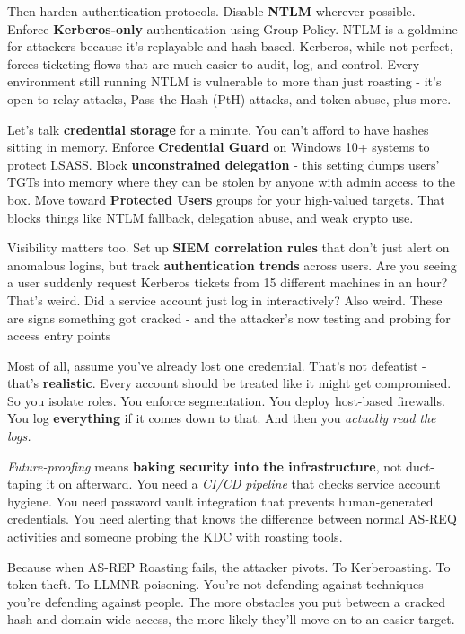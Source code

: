 Then harden authentication protocols. Disable \textbf{NTLM} wherever possible. Enforce \textbf{Kerberos-only} authentication using Group Policy. NTLM is a goldmine for attackers because it’s replayable and hash-based. Kerberos, while not perfect, forces ticketing flows that are much easier to audit, log, and control. Every environment still running NTLM is vulnerable to more than just roasting - it’s open to relay attacks, Pass-the-Hash (PtH) attacks, and token abuse, plus more.

Let’s talk \textbf{credential storage} for a minute. You can’t afford to have hashes sitting in memory. Enforce \textbf{Credential Guard }on Windows 10+ systems to protect LSASS. Block \textbf{unconstrained delegation} - this setting dumps users’ TGTs into memory where they can be stolen by anyone with admin access to the box. Move toward \textbf{Protected Users} groups for your high-valued targets. That blocks things like NTLM fallback, delegation abuse, and weak crypto use.

Visibility matters too. Set up \textbf{SIEM correlation rules }that don’t just alert on anomalous logins, but track \textbf{authentication trends} across users. Are you seeing a user suddenly request Kerberos tickets from 15 different machines in an hour? That’s weird. Did a service account just log in interactively? Also weird. These are signs something got cracked - and the attacker’s now testing and probing for access entry points

Most of all, assume you’ve already lost one credential. That’s not defeatist - that’s \textbf{realistic}. Every account should be treated like it might get compromised. So you isolate roles. You enforce segmentation. You deploy host-based firewalls. You log \textbf{everything} if it comes down to that. And then you \textit{actually read the logs.}

\textit{Future-proofing} means \textbf{baking security into the infrastructure}, not duct-taping it on afterward. You need a \textit{CI/CD pipeline} that checks service account hygiene. You need password vault integration that prevents human-generated credentials. You need alerting that knows the difference between normal AS-REQ activities and someone probing the KDC with roasting tools.

Because when AS-REP Roasting fails, the attacker pivots. To Kerberoasting. To token theft. To LLMNR poisoning. You’re not defending against techniques - you’re defending against people. The more obstacles you put between a cracked hash and domain-wide access, the more likely they’ll move on to an easier target.

